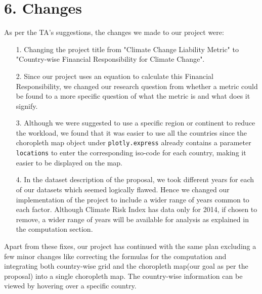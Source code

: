 \documentclass[fontsize=11pt]{article}
\begin{document}
    \section*{6. Changes}

    As per the TA's suggestions, the changes we made to our project were:
    \begin{enumerate}
        \item [1.] Changing the project title from "Climate Change Liability Metric" to "Country-wise Financial
                    Responsibility for Climate Change".
        \item [2.] Since our project uses an equation to calculate this Financial Responsibility, we changed our
                    research question from whether a metric could be found to a more specific question of what the
                    metric is and what does it signify.
        \item [3.] Although we were suggested to use a specific region or continent to reduce the workload, we found
                    that it was easier to use all the countries since the choropleth map object under \texttt{plotly.express}
                    already contains a parameter \texttt{locations} to enter the corresponding iso-code for each country,
                    making it easier to be displayed on the map.
        \item [4.] In the dataset description of the proposal, we took different years for each of our datasets which seemed logically flawed.
                    Hence we changed our implementation of the project to include a wider range of years common to each
                    factor. Although Climate Risk Index has data only for 2014, if chosen to remove, a wider range of
                    years will be available for analysis as explained in the computation section.
    \end{enumerate}
    Apart from these fixes, our project has continued with the same plan excluding a few minor changes like correcting the
    formulas for the computation and integrating both country-wise grid and the choropleth map(our goal as per the proposal)
    into a single choropleth map. The country-wise information can be viewed by hovering over a specific country. \newline
    
\end{document}
